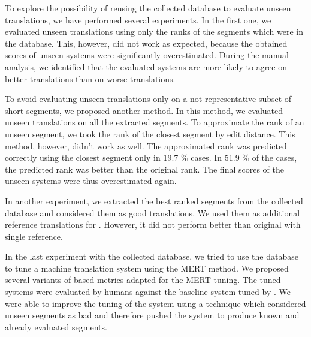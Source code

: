 To explore the possibility of reusing the collected database to evaluate unseen
translations, we have performed several experiments. In the first one, we
evaluated unseen translations using only the ranks of the segments which were
in the database.  This, however, did not work as expected, because the obtained
scores of unseen systems were significantly overestimated. During the manual
analysis, we identified that the evaluated systems are more likely to agree on
better translations than on worse translations.

\begin{comment}
Although this method cannot be
used for evaluating unseen translations, we found out that errors in machine
translation are unique.
\end{comment}

To avoid evaluating unseen translations only on a not-representative subset of
short segments, we proposed another method. In this method, we evaluated unseen
translations on all the extracted segments. To approximate the rank of an
unseen segment, we took the rank of the closest segment by edit distance. This
method, however, didn't work as well.  The approximated rank was predicted
correctly using the closest segment only in 19.7 \% cases.  In 51.9 \% of the
cases, the predicted rank was better than the original rank. The final scores
of the unseen systems were thus overestimated again.

\begin{comment}
The important observation here is that the candidates are closer to the
better candidates than to the equally good or worse candidates. This is somehow
consistent with the previous finding that errors in machine translation are
unique.
\end{comment}

In another experiment, we extracted the best ranked segments from the collected
database and considered them as good translations. We used them as additional
reference translations for . However, it did not perform better
than original  with single reference. 

In the last experiment with the collected database, we tried to use the
database to tune a machine translation system using the MERT method.  We
proposed several variants of  based metrics adapted for the
MERT tuning. The tuned systems were evaluated by humans against the baseline
system tuned by .  We were able to improve the tuning of the
system using a technique which considered unseen segments as bad and therefore
pushed the system to produce known and already evaluated segments.

